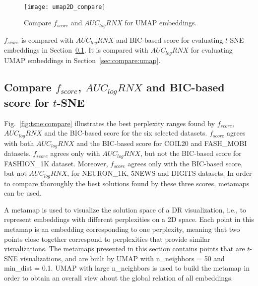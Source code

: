 ~
\begin{figure}[ht!]
    \centering
    \texttt{[image: umap2D\_compare]}
    \caption{Compare $f_{score}$ and $AUC_{log}RNX$ for UMAP embeddings.}
    \label{fig:score:umap2D:compare}
\end{figure}


$f_{score}$ is compared with $AUC_{log}RNX$ and BIC-based score for evaluating $t$-SNE embeddings in Section~\ref{sec:compare:tnse}.
It is compared with $AUC_{log}RNX$ for evaluating UMAP embeddings in Section~\ref{sec:compare:umap}.

\subsection{Compare $f_{score}$, $AUC_{log}RNX$ and BIC-based score for $t$-SNE}\label{sec:compare:tnse}

Fig.~\ref{fig:tsne:compare} illustrates the best perplexity ranges found by $f_{score}$, $AUC_{log}RNX$ and the BIC-based score for the six selected datasets.
$f_{score}$ agrees with both $AUC_{log}RNX$ and the BIC-based score for COIL20 and {FASH\_MOBI} datasets.
$f_{score}$ agrees only with $AUC_{log}RNX$, but not the BIC-based score for {FASHION\_1K} dataset.
Moreover, $f_{score}$ agrees only with the BIC-based score, but not $AUC_{log}RNX$, for {NEURON\_1K}, 5NEWS and DIGITS datasets.
In order to compare thoroughly the best solutions found by these three scores, metamaps can be used.

A metamap is used to visualize the solution space of a DR visualization, i.e., to represent embeddings with different perplexities on a 2D space.
Each point in this metamap is an embedding corresponding to one perplexity, meaning that two points close together correspond to perplexities that provide similar visualizations.
The metamaps presented in this section contains points that are $t$-SNE visualizations, and are built by UMAP with {n\_neighbors} = 50 and {min\_dist} = 0.1.
UMAP with large {n\_neighbors} is used to build the metamap in order to obtain an overall view about the global relation of all embeddings.

